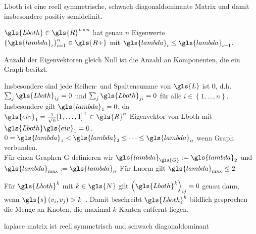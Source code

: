\gls{Lboth} ist eine reell symmetrische, schwach diagonaldominante Matrix und damit insbesondere positiv semidefinit.

$\gls{Lboth} \in \gls{R}^{n \times n}$ hat genau $n$ Eigenwerte ${\left\{\gls{lambda}_i\right\}}_{i = 1}^n \in \gls{R+}$ mit $\gls{lambda}_i \leq \gls{lambda}_{i+1}$.

Anzahl der Eigenvektoren gleich Null ist die Anzahl an Komponenten, die ein Graph besitzt.

Insbesondere sind jede Reihen- und Spaltensumme von $\gls{L}$ ist $0$, d.h.\ $\sum_j \gls{Lboth}_{ij} = 0$ und $\sum_j \gls{Lboth}_{ji} = 0$ für alle $i \in \left\{1, \ldots, n\right\}$.
Insbesondere gilt $\gls{lambda}_1 = 0$, da $\gls{eiv}_1 = \frac{1}{\sqrt{n}}{\left[1, \ldots, 1\right]}^{\top} \in \gls{R}^n$ Eigenvektor von \gls{Lboth} mit $\gls{Lboth}\gls{eiv}_1 = 0$.\\

$0 = \gls{lambda}_1 < \gls{lambda}_2 \leq \cdots \leq \gls{lambda}_n$ wenn Graph verbunden.\\

Für einen Graphen \gls{G} definieren wir $\gls{lambda}_{\gls{G}} := \gls{lambda}_2$ und $\gls{lambda}_{\max} := \gls{lambda}_n$
Für \gls{Lnorm} gilt $\gls{lambda}_{\max} \leq 2$

Für $\gls{Lboth}^{k}$ mit $k \in \gls{N}$ gilt ${\left(\gls{Lboth}^k\right)}_{ij} = 0$ genau dann, wenn $\gls{s}\left(v_i, v_j\right) > k$~\cite{Hammond}.
Damit beschreibt $\gls{Lboth}^k$ bildlich gesprochen die Menge an Knoten, die maximal $k$ Kanten entfernt liegen.



laplace matrix ist reell symmetrisch und schwach diagonaldominant
